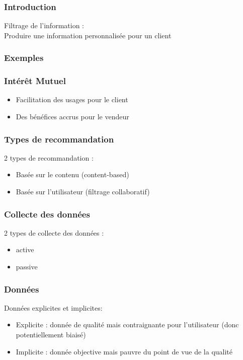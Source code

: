 \begin{frame}
  \frametitle{Introduction}
  Filtrage de l'information : \\
  \newline
  Produire une information personnalisée pour un \og client\fg
\end{frame}

\begin{frame}
  \frametitle{Exemples}
  \begin{minipage}[l]{0.33\linewidth}
  \end{minipage}\hfill
  \begin{minipage}[l]{0.33\linewidth}
  \end{minipage}\hfill
  \begin{minipage}[l]{0.33\linewidth}
  \end{minipage}\hfill
\end{frame}

\begin{frame}
  \frametitle{Intérêt Mutuel}
  \begin{itemize}
  \item Facilitation des usages pour le \og client\fg
  \item Des bénéfices accrus pour le \og vendeur\fg
  \end{itemize}
\end{frame}

\begin{frame}
  \frametitle{Types de recommandation}
  2 types de recommandation :
  \begin{itemize}
  \item Basée sur le contenu (content-based)
  \item Basée sur l'utilisateur (filtrage collaboratif)
  \end{itemize}
\end{frame}

\begin{frame}
  \frametitle{Collecte des données}
  2 types de collecte des données : 
  \begin{itemize}
  \item active
  \item passive
  \end{itemize}
\end{frame}

\begin{frame}
  \frametitle{Données}
  Données explicites et implicites:
  \begin{itemize}
    \item Explicite : donnée de qualité mais contraignante pour l'utilisateur (donc potentiellement biaisé)\\
    \item Implicite : donnée objective mais pauvre du point de vue de la qualité  
  \end{itemize}
\end{frame}

